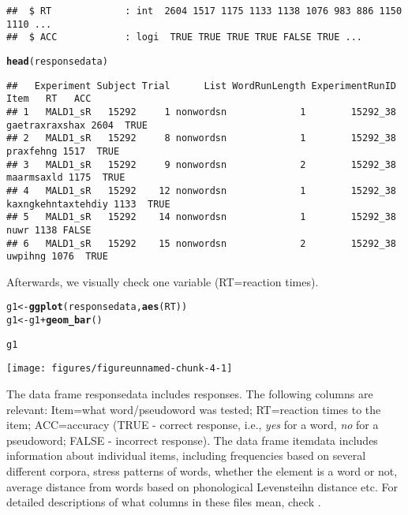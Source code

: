 \documentclass{article}\usepackage[]{graphicx}\usepackage[]{color}
\makeatletter
\def\maxwidth{ %
  \ifdim\Gin@nat@width>\linewidth
    \linewidth
  \else
    \Gin@nat@width
  \fi
}
\newcommand{\hlopt}[1]{\textcolor[rgb]{0,0,0}{#1}}%
\newcommand{\hlstd}[1]{\textcolor[rgb]{0.345,0.345,0.345}{#1}}%
\newcommand{\hlkwb}[1]{\textcolor[rgb]{0.69,0.353,0.396}{#1}}%
\newcommand{\hlkwd}[1]{\textcolor[rgb]{0.737,0.353,0.396}{\textbf{#1}}}%
\newenvironment{kframe}{%
 \def\at@end@of@kframe{}%
 \ifinner\ifhmode%
  \def\at@end@of@kframe{\end{minipage}}%
  \begin{minipage}{\columnwidth}%
 \fi\fi%
 \def\FrameCommand##1{\hskip\@totalleftmargin \hskip-\fboxsep
 \colorbox{shadecolor}{##1}\hskip-\fboxsep
     \hskip-\linewidth \hskip-\@totalleftmargin \hskip\columnwidth}%
 \MakeFramed {\advance\hsize-\width
   \@totalleftmargin\z@ \linewidth\hsize
   \@setminipage}}%
 {\par\unskip\endMakeFramed%
 \at@end@of@kframe}
\newenvironment{knitrout}{}{} %
\makeatother
\begin{document}
\begin{knitrout}
\begin{kframe}
\begin{verbatim}
##  $ RT             : int  2604 1517 1175 1133 1138 1076 983 886 1150 1110 ...
##  $ ACC            : logi  TRUE TRUE TRUE TRUE FALSE TRUE ...
\end{verbatim}
\begin{alltt}
\hlkwd{head}\hlstd{(responsedata)}
\end{alltt}
\begin{verbatim}
##   Experiment Subject Trial      List WordRunLength ExperimentRunID               Item   RT   ACC
## 1   MALD1_sR   15292     1 nonwordsn             1        15292_38     gaetraxraxshax 2604  TRUE
## 2   MALD1_sR   15292     8 nonwordsn             1        15292_38          praxfehng 1517  TRUE
## 3   MALD1_sR   15292     9 nonwordsn             2        15292_38         maarmsaxld 1175  TRUE
## 4   MALD1_sR   15292    12 nonwordsn             1        15292_38 kaxngkehntaxtehdiy 1133  TRUE
## 5   MALD1_sR   15292    14 nonwordsn             1        15292_38               nuwr 1138 FALSE
## 6   MALD1_sR   15292    15 nonwordsn             2        15292_38            uwpihng 1076  TRUE
\end{verbatim}
\end{kframe}
\end{knitrout}

Afterwards, we visually check one variable (RT=reaction times).

\begin{knitrout}
\color{fgcolor}\begin{kframe}
\begin{alltt}
\hlstd{g1} \hlkwb{<-} \hlkwd{ggplot}\hlstd{(responsedata,} \hlkwd{aes}\hlstd{(RT))}
\hlstd{g1} \hlkwb{<-} \hlstd{g1} \hlopt{+} \hlkwd{geom_bar}\hlstd{()}

\hlstd{g1}
\end{alltt}
\end{kframe}
\texttt{[image: figures/figureunnamed-chunk-4-1]} 

\end{knitrout}


The data frame responsedata includes responses. The following columns are relevant: Item=what word/pseudoword was tested; RT=reaction times to the item; ACC=accuracy (TRUE - correct response, i.e., \textit{yes} for a word, \textit{no} for a pseudoword; FALSE - incorrect response). The data frame itemdata includes information about individual items, including frequencies based on several different corpora, stress patterns of words, whether the element is a word or not, average distance from words based on phonological Levensteihn distance etc. For detailed descriptions of what columns in these files mean, check \cite{tucker+19}.
\end{document}
